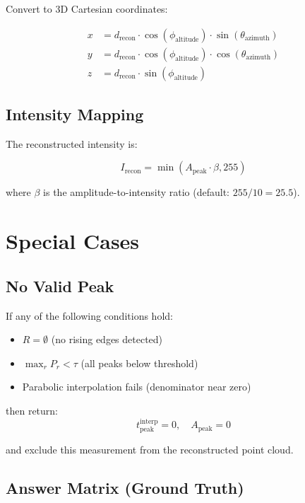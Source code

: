 \documentclass[11pt]{article}
\begin{document}
Convert to 3D Cartesian coordinates:

\begin{equation}
\begin{aligned}
x &= d_{\text{recon}} \cdot \cos(\phi_{\text{altitude}}) \cdot \sin(\theta_{\text{azimuth}}) \\
y &= d_{\text{recon}} \cdot \cos(\phi_{\text{altitude}}) \cdot \cos(\theta_{\text{azimuth}}) \\
z &= d_{\text{recon}} \cdot \sin(\phi_{\text{altitude}})
\end{aligned}
\end{equation}

\subsection{Intensity Mapping}

The reconstructed intensity is:

\begin{equation}
I_{\text{recon}} = \min\left(A_{\text{peak}} \cdot \beta, 255\right)
\end{equation}

where $\beta$ is the amplitude-to-intensity ratio (default: $255/10 = 25.5$).

\section{Special Cases}

\subsection{No Valid Peak}

If any of the following conditions hold:
\begin{itemize}
    \item $R = \emptyset$ (no rising edges detected)
    \item $\max_r P_r < \tau$ (all peaks below threshold)
    \item Parabolic interpolation fails (denominator near zero)
\end{itemize}

then return:
\begin{equation}
t_{\text{peak}}^{\text{interp}} = 0, \quad A_{\text{peak}} = 0
\end{equation}

and exclude this measurement from the reconstructed point cloud.

\subsection{Answer Matrix (Ground Truth)}
\end{document}
